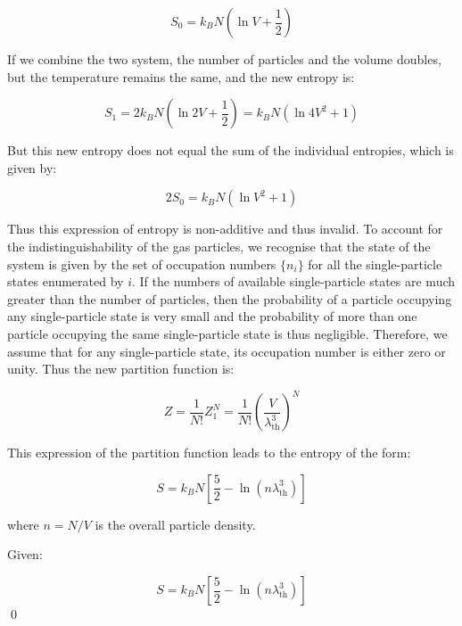 \documentclass[12pt]{article}
\begin{document}
\begin{equation}
S_{0} = k_{B} N \left( \ln{V} + \frac{1}{2} \right)
\end{equation}

If we combine the two system, the number of particles and the volume doubles, but the temperature remains the same, and the new entropy is:

\begin{equation}
S_{1} = 2 k_{B} N \left( \ln{2V} + \frac{1}{2} \right) = k_{B} N \left( \ln{4V^2} + 1 \right)
\end{equation}

But this new entropy does not equal the sum of the individual entropies, which is given by:

\begin{equation}
2S_{0} = k_{B} N \left( \ln{V^2} + 1 \right)
\end{equation}

Thus this expression of entropy is non-additive and thus invalid. To account for the indistinguishability of the gas particles, we recognise that the state of the system is given by the set of occupation numbers $\{n_{i}\}$ for all the single-particle states enumerated by $i$. If the numbers of available single-particle states are much greater than the number of particles, then the probability of a particle occupying any single-particle state is very small and the probability of more than one particle occupying the same single-particle state is thus negligible. Therefore, we assume that for any single-particle state, its occupation number is either zero or unity. Thus the new partition function is:

\begin{equation}
Z = \frac{1}{N!} Z_{1}^{N} = \frac{1}{N!} \left( \frac{V}{\lambda_{\text{th}}^3} \right)^{N} 
\end{equation}

This expression of the partition function leads to the entropy of the form:

\begin{equation}
S = k_{B} N \left[ \frac{5}{2} - \ln{(n \lambda_{\text{th}}^3)} \right]
\end{equation}

where $n = N/V$ is the overall particle density.


Given:

\begin{equation}
S = k_{B} N \left[ \frac{5}{2} - \ln{(n \lambda_{\text{th}}^3)} \right]
\end{equation}
\qed
\end{document}
